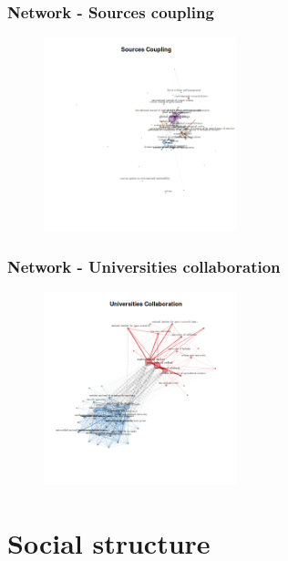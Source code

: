 \documentclass[aspectratio=169]{beamer}
\begin{document}
\begin{frame}
	\frametitle{Network - Sources coupling}
	\begin{figure}
		\centering
		\includegraphics[width=0.5\textwidth]
		{figures/bnet_sources_coupling.png}
	\end{figure}
\end{frame}

\begin{frame}
	\frametitle{Network - Universities collaboration}
	\begin{figure}
		\centering
		\includegraphics[width=0.5\textwidth]
		{figures/bnet_universities_collaboration.png}
	\end{figure}
\end{frame}



\section{Social structure}




\end{document}
